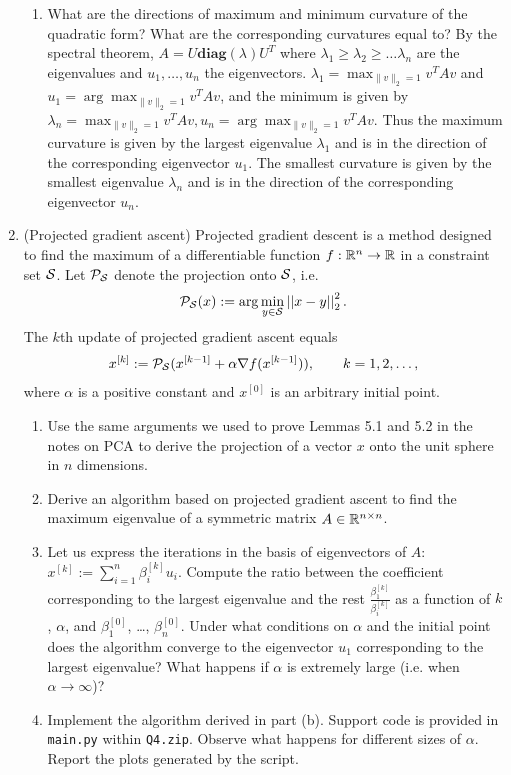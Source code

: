 \documentclass[12pt,twoside]{article}
\begin{document}
\begin{enumerate}
\begin{enumerate}
\item What are the directions of maximum and minimum curvature of the quadratic form? What are the corresponding curvatures equal to?
By the spectral theorem, $A = U \textbf{diag}(\lambda) U^T$ where $\lambda_1 \ge \lambda_2 \ge \ldots \lambda_n$ are the eigenvalues and $u_1, \dots, u_n$ the eigenvectors.
$\lambda_1 = \max_{\|v\|_2 =1} v^T A v$ and $u_1 = \arg \max_{\|v\|_2 =1} v^T A v$, and the minimum is given by $\lambda_n = \max_{\|v\|_2 =1} v^T A v, u_n = \arg \max_{\|v\|_2 =1} v^T A v$. Thus the maximum curvature is given by the largest eigenvalue $\lambda_1$ and  is in the direction of the corresponding eigenvector $u_1$. 
	The smallest curvature is  given  by  the  smallest  eigenvalue $\lambda_n$ and is in the direction of the corresponding eigenvector $u_n$.

\end{enumerate}

\item (Projected gradient ascent) Projected gradient descent is a method designed to find the maximum of a differentiable function $f:\mathbb{R}^n \rightarrow \mathbb{R}$ in a constraint set $\mathcal{ S }$. Let $\mathcal{ P }_{\mathcal{ S }}$ denote the projection onto $\mathcal{ S }$, i.e.
\begin{align}
\mathcal{ P }_{\mathcal{ S }}(x) := \arg \min_{y \in \mathcal{ S }} \left|\left| x-y \right|\right| _{2}^2.
\end{align} 
The $k$th update of projected gradient ascent equals
\begin{align}
x^{[k]} :=\mathcal{ P }_{\mathcal{ S }}( x^{[k-1]} + \alpha \nabla f (x^{[k-1]}) ), \qquad k=1,2,\ldots,
\end{align}
where $\alpha$ is a positive constant and $x^{[0]}$ is an arbitrary initial point.
\begin{enumerate}
\item Use the same arguments we used to prove Lemmas 5.1 and 5.2 in the notes on PCA to derive the projection of a vector $x$ onto the unit sphere in $n$ dimensions.
\item Derive an algorithm based on projected gradient ascent to find the maximum eigenvalue of a symmetric matrix $A\in \mathbb{R}^{n \times n}$.
\item Let us express the iterations in the basis of eigenvectors of $A$: $x^{[k]} := \sum_{i=1}^{n}\beta_i^{[k]} u_i$. Compute the ratio between the coefficient corresponding to the largest eigenvalue and the rest $\frac{\beta_1^{[k]}}{\beta_i^{[k]}}$ as a function of $k$, $\alpha$, and $\beta_1^{[0]}$, \ldots, $\beta_n^{[0]}$. Under what conditions on $\alpha$ and the initial point does the algorithm converge to the eigenvector $u_1$ corresponding to the largest eigenvalue? What happens if $\alpha$ is extremely large (i.e. when $\alpha \rightarrow \infty$)?
\item Implement the algorithm derived in part (b). Support code is provided in {\tt main.py} within {\tt Q4.zip}. Observe what happens for different sizes of $\alpha$. Report the plots generated by the script.
\end{enumerate}

\end{enumerate}
\end{document}
